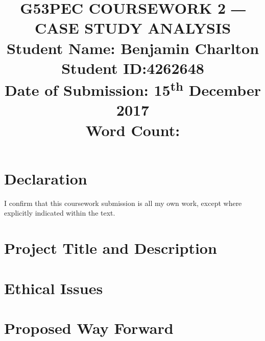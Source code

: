 \documentclass[a4paper]{article}
\begin{document}
\title{
    G53PEC COURSEWORK 2 ― CASE STUDY ANALYSIS \\
    \large{Student Name: Benjamin Charlton \\
            Student ID:\@ 4262648 \\
            Date of Submission: 15\textsuperscript{th} December 2017\\
            Word Count: \\}
    \date{}}
\maketitle

\section*{Declaration}
I confirm that this coursework submission is all my own work, except where explicitly indicated within the text.

\section*{Project Title and Description}

\section*{Ethical Issues}

\section*{Proposed Way Forward}

\nocite{worldsOverview}


\end{document}

